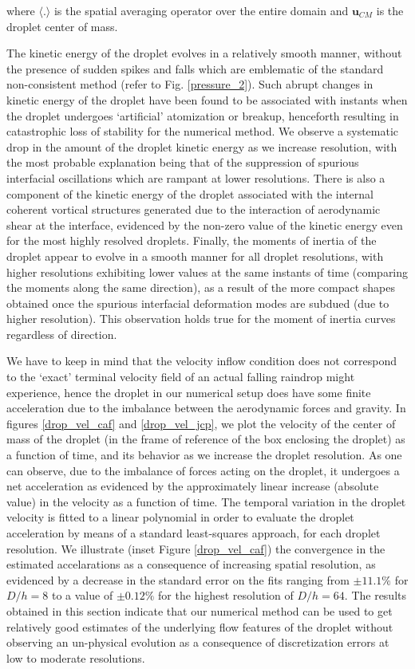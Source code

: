 where $ \langle . \rangle$ is the spatial averaging operator over the  
entire domain and $\boldsymbol{u}_{CM}$ is the droplet center of mass.


The kinetic energy of the droplet evolves in a relatively smooth manner, 
without the presence of sudden spikes and falls which are emblematic of 
the standard non-consistent method (refer to Fig. \ref{pressure_2}). 
Such abrupt changes in kinetic energy of the droplet have been 
found to be associated with instants when the droplet undergoes 
`artificial' atomization or breakup, henceforth resulting in 
catastrophic loss of stability for the numerical method. 
We observe a systematic drop in the amount of the droplet 
kinetic energy as we increase resolution, with the most probable explanation 
being that of the suppression of spurious interfacial 
oscillations which are rampant at lower resolutions. 
There is also a component of the kinetic energy of the droplet 
associated with the internal coherent vortical structures generated due to 
the interaction of aerodynamic shear at the interface, 
evidenced by the non-zero value of the kinetic 
energy even for the most highly resolved droplets. 
Finally, the moments of inertia of the droplet appear to evolve 
in a smooth manner for all droplet resolutions, with higher 
resolutions exhibiting lower values at the same instants of time (comparing the moments along the same direction), 
as a result of the more compact shapes obtained once the 
spurious interfacial deformation modes are subdued (due to higher resolution). 
This observation holds true for the moment of inertia curves regardless of direction.           


We have to keep in mind that the velocity inflow condition 
does not correspond to the `exact' terminal velocity 
field of an actual falling raindrop might experience, 
hence the droplet in our numerical setup does have some 
finite acceleration due to the imbalance 
between the aerodynamic forces and gravity. 
In figures \ref{drop_vel_caf} and \ref{drop_vel_jcp}, we plot the velocity of 
the center of mass of the droplet (in the frame of reference 
of the box enclosing the droplet) as a function of time, 
and its behavior as we increase the droplet resolution. 
As one can observe, due to the imbalance of forces acting on the droplet, 
it undergoes a net acceleration as evidenced by the approximately 
linear increase (absolute value) in the velocity as a function of time. 
The temporal variation in the droplet velocity is fitted to a 
linear polynomial in order to evaluate the droplet acceleration 
by means of a standard least-squares approach, for each droplet resolution. 
We illustrate (inset Figure \ref{drop_vel_caf}) the convergence in the estimated 
accelarations as a consequence of increasing spatial resolution, 
as evidenced by a decrease in the standard error on the fits 
ranging from $\pm 11.1 \%$ for $D/h = 8$ to a value of $\pm 0.12 \%$ 
for the highest resolution of $D/h = 64$. 
The results obtained in this section indicate that 
our numerical method can be used to get relatively good 
estimates of the underlying flow features of the droplet 
without observing an un-physical evolution as a consequence 
of discretization errors at low to moderate resolutions.           


